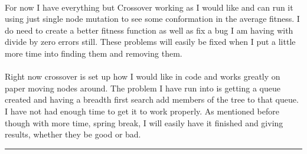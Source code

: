 \documentclass[paper=a4, fontsize=11pt]{scrartcl} %
\numberwithin{equation}{section} %
\numberwithin{figure}{section} %
\numberwithin{table}{section} %
\newcommand{\horrule}[1]{\rule{\linewidth}{#1}} %
\begin{document}
\paragraph{} For now I have everything but Crossover working as I would like and can run it using just single node mutation to see some conformation in the average fitness. I do need to create a better fitness function as well as fix a bug I am having with divide by zero errors still. These problems will easily be fixed when I put a little more time into finding them and  removing them.

\paragraph{} Right now crossover is set up how I would like in code and works greatly on paper moving nodes around. The problem I have run into is getting a queue created and having a breadth first search add members of the tree to that queue. I have not had enough time to get it to work properly. As mentioned before though with more time, spring break, I will easily have it finished and giving results, whether they be good or bad.


\horrule{0.5pt} \\[0.4cm] %
\end{document}

